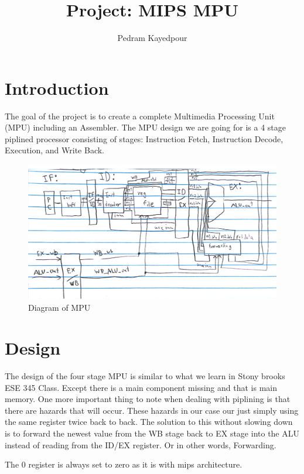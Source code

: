 \documentclass{article}
\title{Project: MIPS MPU}
\author{Pedram Kayedpour}
\begin{document}
\maketitle

\section{Introduction}

The goal of the project is to create a complete Multimedia Processing Unit (MPU) including an Assembler. The MPU design we are going for is a 4 stage piplined processor consisting of stages: Instruction Fetch, Instruction Decode, Execution, and Write Back.

\begin{figure}
	\centering
	\includegraphics[width=1\linewidth]{diagram.png}
	\caption{Diagram of MPU}
	\label{fig:diagram}
\end{figure}

\section{Design}

The design of the four stage MPU is similar to what we learn in Stony brooks ESE 345 Class. Except there is a main component missing and that is main memory. One more important thing to note when dealing with piplining is that there are hazards that will occur. These hazards in our case our just simply using the same register twice back to back. The solution to this without slowing down is to forward the newest value from the WB stage back to EX stage into the ALU instead of reading from the ID/EX register. Or in other words, Forwarding.

The 0 register is always set to zero as it is with mips architecture.
\end{document}
